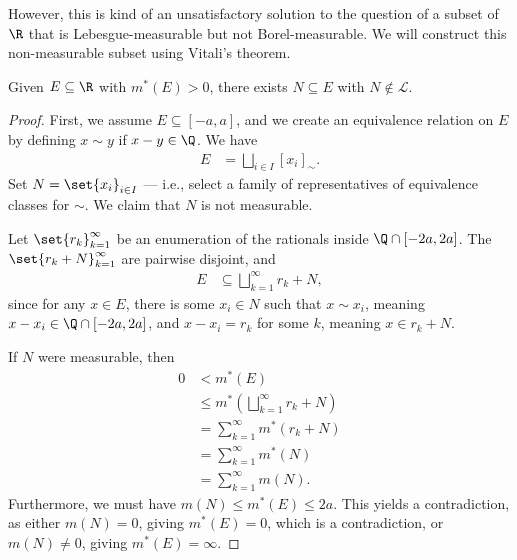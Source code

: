 \documentclass[10pt]{mypackage}
\begin{document}
However, this is kind of an unsatisfactory solution to the question of a subset of $\R$ that is Lebesgue-measurable but not Borel-measurable. We will construct this non-measurable subset using Vitali's theorem.
\begin{theorem}[Vitali]
  Given $E\subseteq \R$ with $m^{\ast}(E) > 0$, there exists $N\subseteq E$ with $N\notin \mathcal{L}$.
\end{theorem}
\begin{proof}
  First, we assume $E\subseteq [-a,a]$, and we create an equivalence relation on $E$ by defining $x\sim y$ if $x-y\in \Q$. We have
  \begin{align*}
    E &= \bigsqcup_{i\in I} \left[ x_i \right]_{\sim}.
  \end{align*}
  Set $N = \set{x_i}_{i\in I}$ --- i.e., select a family of representatives of equivalence classes for $\sim$. We claim that $N$ is not measurable.\newline

  Let $\set{r_k}_{k=1}^{\infty}$ be an enumeration of the rationals inside $\Q\cap [-2a,2a]$. The $\set{r_k + N}_{k=1}^{\infty}$ are pairwise disjoint, and
  \begin{align*}
    E &\subseteq \bigsqcup_{k=1}^{\infty}r_k + N,
  \end{align*}
  since for any $x\in E$, there is some $x_i\in N$ such that $x\sim x_i$, meaning $x-x_i\in \Q\cap [-2a,2a]$, and $x-x_i= r_k$ for some $k$, meaning $x\in r_k + N$.\newline

  If $N$ were measurable, then
  \begin{align*}
    0 &< m^{\ast}\left( E \right)\\
      &\leq m^{\ast}\left( \bigsqcup_{k=1}^{\infty}r_k + N \right)\\
      &= \sum_{k=1}^{\infty}m^{\ast}\left( r_k + N \right)\\
      &= \sum_{k=1}^{\infty}m^{\ast}\left( N \right)\\
      &= \sum_{k=1}^{\infty}m\left( N \right).
  \end{align*}
  Furthermore, we must have $m\left( N \right) \leq m^{\ast}\left( E \right) \leq 2a$. This yields a contradiction, as either $m\left( N \right) = 0$, giving $m^{\ast}\left( E \right) = 0$, which is a contradiction, or $m(N) \neq 0$, giving $m^{\ast}\left( E \right) = \infty$.
\end{proof}
\end{document}

